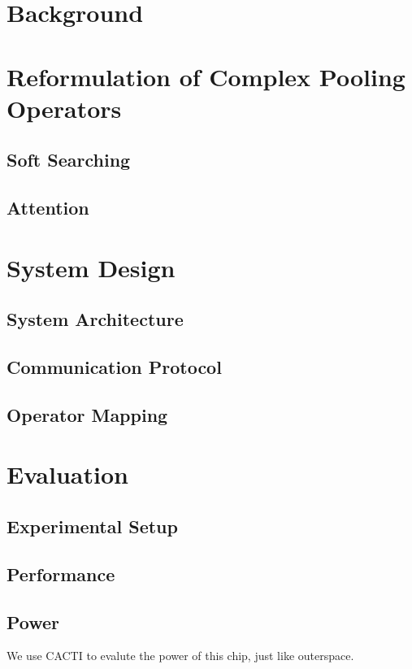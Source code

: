 \documentclass[conference]{IEEEtran}
\begin{document}
\section{Background}



\section{Reformulation of Complex Pooling Operators}
\subsection{Soft Searching}

\subsection{Attention}


\section{System Design}
\subsection{System Architecture}
\subsection{Communication Protocol}
\subsection{Operator Mapping}



\section{Evaluation}
\subsection{Experimental Setup}
\subsection{Performance}

\subsection{Power}
We use CACTI \cite{cacti6} to evalute the power of this chip,
just like outerspace.
\end{document}
